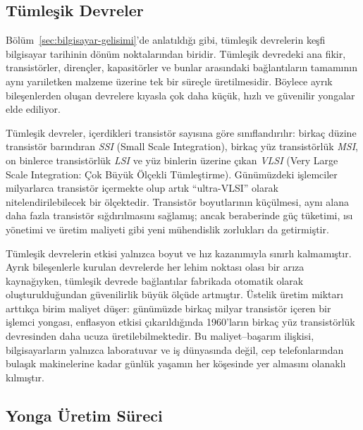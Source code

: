 \subsection{Tümleşik Devreler}
\label{sec:tumlesik-devreler}
Bölüm~\ref{sec:bilgisayar-gelisimi}'de anlatıldığı gibi, tümleşik devrelerin keşfi bilgisayar tarihinin dönüm noktalarından biridir. Tümleşik devredeki ana fikir, transistörler, dirençler, kapasitörler ve bunlar arasındaki bağlantıların tamamının aynı yarıiletken malzeme üzerine tek bir süreçle üretilmesidir. Böylece ayrık bileşenlerden oluşan devrelere kıyasla çok daha küçük, hızlı ve güvenilir yongalar elde ediliyor.

Tümleşik devreler, içerdikleri transistör sayısına göre sınıflandırılır: birkaç düzine transistör barındıran \emph{SSI} (Small Scale Integration), birkaç yüz transistörlük \emph{MSI}, on binlerce transistörlük \emph{LSI} ve yüz binlerin üzerine çıkan \emph{VLSI} (Very Large Scale Integration: Çok Büyük Ölçekli Tümleştirme). Günümüzdeki işlemciler milyarlarca transistör içermekte olup artık ``ultra-VLSI'' olarak nitelendirilebilecek bir ölçektedir. Transistör boyutlarının küçülmesi, aynı alana daha fazla transistör sığdırılmasını sağlamış; ancak beraberinde güç tüketimi, ısı yönetimi ve üretim maliyeti gibi yeni mühendislik zorlukları da getirmiştir.

Tümleşik devrelerin etkisi yalnızca boyut ve hız kazanımıyla sınırlı kalmamıştır. Ayrık bileşenlerle kurulan devrelerde her lehim noktası olası bir arıza kaynağıyken, tümleşik devrede bağlantılar fabrikada otomatik olarak oluşturulduğundan güvenilirlik büyük ölçüde artmıştır. Üstelik üretim miktarı arttıkça birim maliyet düşer: günümüzde birkaç milyar transistör içeren bir işlemci yongası, enflasyon etkisi çıkarıldığında 1960'ların birkaç yüz transistörlük devresinden daha ucuza üretilebilmektedir. Bu maliyet--başarım ilişkisi, bilgisayarların yalnızca laboratuvar ve iş dünyasında değil, cep telefonlarından bulaşık makinelerine kadar günlük yaşamın her köşesinde yer almasını olanaklı kılmıştır.

\subsection{Yonga Üretim Süreci}
\label{sec:yonga-uretim-sureci}


